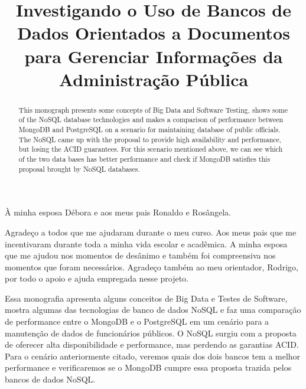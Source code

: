 \documentclass[licenciatura]{unb-cic}
\title{Investigando o {U}so de {B}ancos de {D}ados {O}rientados a {D}ocumentos para 
{G}erenciar {I}nformações da {A}dministração {P}ública}
\begin{document}
  \maketitle
  \pretextual

  \begin{dedicatoria}
À minha esposa Débora e aos meus pais Ronaldo e Rosângela.
  \end{dedicatoria}

  \begin{agradecimentos}
  Agradeço a todos que me ajudaram durante o meu curso. Aos meus pais que me incentivaram durante toda a minha vida escolar e acadêmica. A minha esposa que me ajudou nos momentos de desânimo e também foi compreensiva nos momentos que foram necessários.
Agradeço também ao meu orientador, Rodrigo, por todo o apoio e ajuda empregada nesse projeto.
  \end{agradecimentos}

  \begin{resumo}
Essa monografia apresenta alguns conceitos de Big Data e Testes de Software, mostra algumas das tecnologias de banco de dados NoSQL e  faz uma comparação de performance entre o MongoDB e o PostgreSQL em um cenário para a manutenção de dados de funcionários públicos. O NoSQL surgiu com a proposta de oferecer alta disponibilidade e performance, mas perdendo as garantias ACID. Para o cenário anteriormente citado, veremos quais dos dois bancos tem a melhor performance e verificaremos se o MongoDB cumpre essa proposta trazida pelos bancos de dados NoSQL.
  \end{resumo}

{
  \begin{abstract}
This monograph presents some concepts of Big Data and Software Testing, shows some of the NoSQL database technologies and makes a comparison of performance between MongoDB and PostgreSQL on a scenario for maintaining database of public officials. The NoSQL came up with the proposal to provide high availability and performance, but losing the ACID guarantees. For this scenario mentioned above, we can see which of the two data bases has better performance and check if MongoDB satisfies this proposal brought by NoSQL databases.
  \end{abstract}
}

  \tableofcontents
  \listoffigures
  \listoftables

  \textual
  

  
  
  

  \postextual
  
  
\end{document}
